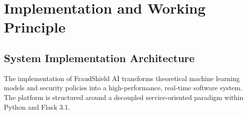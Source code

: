 \chapter{Implementation and Working Principle}
\label{chap:implementation}

\section{System Implementation Architecture}
The implementation of FraudShield AI transforms theoretical machine learning models and security policies into a high-performance, real-time software system. The platform is structured around a decoupled service-oriented paradigm within Python and Flask 3.1.

